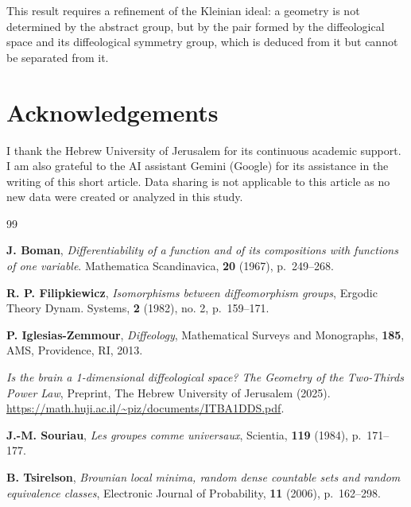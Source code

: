 \documentclass[10pt,letterpaper,reqno]{amsart}
\begin{document}
  This result requires a refinement of the Kleinian ideal:
  a geometry is not determined by the abstract group,
  but by the pair formed by the diffeological space and its diffeological symmetry group,
  which is deduced from it but cannot be separated from it.  
  
  
  \section*{Acknowledgements}
  I thank the Hebrew University of Jerusalem for its continuous academic support.
  I am also grateful to the AI assistant Gemini (Google) for its assistance in the writing of this short article.
  Data sharing is not applicable to this article as no new data were created or analyzed in this study.
  
  
  \begin{thebibliography}{99}
    
    \textbf{J. Boman},
    \textit{Differentiability of a function and of its compositions with functions of one variable}.
    {Mathematica Scandinavica},
    \textbf{20} (1967),
    p.~{249--268}.
    
    \textbf{R. P. Filipkiewicz},
    \textit{Isomorphisms between diffeomorphism groups},
    Ergodic Theory Dynam. Systems,
    \textbf{2} (1982), no. 2, p.~159--171.
    
    \textbf{P. Iglesias-Zemmour},
    \textit{Diffeology},
    Mathematical Surveys and Monographs,
    \textbf{185},
    AMS, Providence, RI, 2013.
    
    \bysame %
    \textit{Is the brain a 1-dimensional diffeological space? The Geometry of the Two-Thirds Power Law},
    Preprint, The Hebrew University of Jerusalem  (2025). \\
    {\scriptsize\url{https://math.huji.ac.il/~piz/documents/ITBA1DDS.pdf}}.
    
    \textbf{J.-M. Souriau},
    \textit{Les groupes comme universaux},
    Scientia,
    \textbf{119} (1984), p.~171--177.
    
    \textbf{B. Tsirelson},
    \textit{Brownian local minima, random dense countable sets and random equivalence classes},
    Electronic Journal of Probability,
    \textbf{11} (2006), p.~162--298.
    
  \end{thebibliography}
  
  
\end{document}

